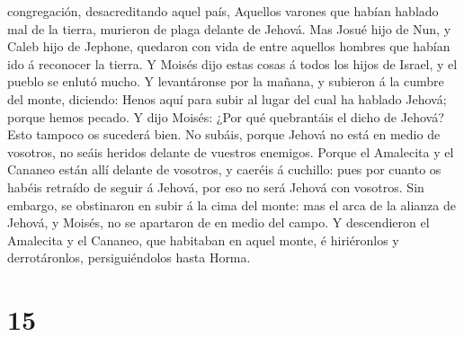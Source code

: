 congregación, desacreditando aquel país,  Aquellos
varones que habían hablado mal de la tierra, murieron de plaga delante
de Jehová.  Mas Josué hijo de Nun, y Caleb hijo de
Jephone, quedaron con vida de entre aquellos hombres que habían ido á
reconocer la tierra.  Y Moisés dijo estas cosas á todos
los hijos de Israel, y el pueblo se enlutó mucho.  Y
levantáronse por la mañana, y subieron á la cumbre del monte, diciendo:
Henos aquí para subir al lugar del cual ha hablado Jehová; porque hemos
pecado.  Y dijo Moisés: ¿Por qué quebrantáis el dicho de
Jehová? Esto tampoco os sucederá bien.  No subáis, porque
Jehová no está en medio de vosotros, no seáis heridos delante de
vuestros enemigos.  Porque el Amalecita y el Cananeo
están allí delante de vosotros, y caeréis á cuchillo: pues por cuanto os
habéis retraído de seguir á Jehová, por eso no será Jehová con vosotros.
 Sin embargo, se obstinaron en subir á la cima del monte:
mas el arca de la alianza de Jehová, y Moisés, no se apartaron de en
medio del campo.  Y descendieron el Amalecita y el
Cananeo, que habitaban en aquel monte, é hiriéronlos y derrotáronlos,
persiguiéndolos hasta Horma.

\hypertarget{section-14}{%
\section{15}\label{section-14}}

